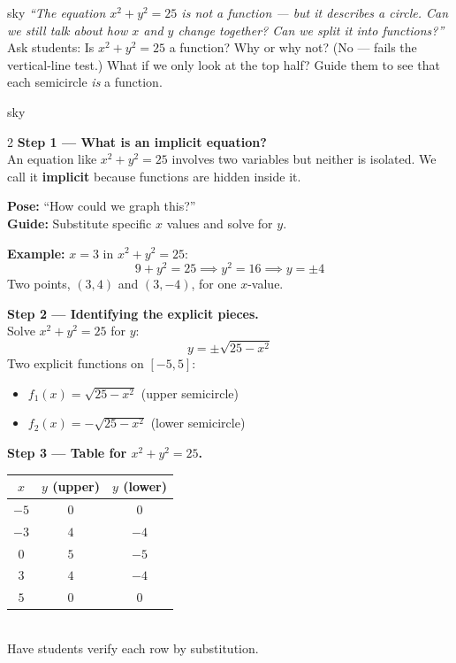 \documentclass[10pt]{article}
\begin{document}
\begin{skillbox}[Hook]{sky}
    \textit{``The equation $x^2 + y^2 = 25$ is not a function --- but it describes a circle.
    Can we still talk about how $x$ and $y$ change together? Can we split it into functions?''}\\[4pt]
    Ask students: Is $x^2 + y^2 = 25$ a function? Why or why not? (No --- fails the vertical-line
    test.) What if we only look at the top half? Guide them to see that each semicircle \emph{is}
    a function.
\end{skillbox}

\begin{skillbox}{sky}
\begin{multicols}{2}
\textbf{Step 1 --- What is an implicit equation?}\\
An equation like $x^2 + y^2 = 25$ involves two variables but neither is isolated.
We call it \textbf{implicit} because functions are hidden inside it.

\textbf{Pose:} ``How could we graph this?'' \\
\textbf{Guide:} Substitute specific $x$ values and solve for $y$.

\textbf{Example:} $x = 3$ in $x^2+y^2=25$:
\[ 9 + y^2 = 25 \implies y^2 = 16 \implies y = \pm 4 \]
Two points, $(3, 4)$ and $(3, -4)$, for one $x$-value.

\textbf{Step 2 --- Identifying the explicit pieces.}\\
Solve $x^2 + y^2 = 25$ for $y$:
\[ y = \pm\sqrt{25-x^2} \]
Two explicit functions on $[-5, 5]$:
\begin{itemize}[leftmargin=1em, itemsep=1pt]
    \item $f_1(x) = \sqrt{25-x^2}$ \;(upper semicircle)
    \item $f_2(x) = -\sqrt{25-x^2}$ \;(lower semicircle)
\end{itemize}

\columnbreak

\textbf{Step 3 --- Table for $x^2+y^2=25$.}\\[2pt]
\renewcommand{\arraystretch}{1.3}
\begin{tabular}{c|c|c}
$x$ & $y$ (upper) & $y$ (lower) \\\hline
$-5$ & $0$  & $0$  \\
$-3$ & $4$  & $-4$ \\
$0$  & $5$  & $-5$ \\
$3$  & $4$  & $-4$ \\
$5$  & $0$  & $0$  \\
\end{tabular}\\[6pt]
Have students verify each row by substitution.


\end{multicols}
\end{skillbox}
\end{document}
